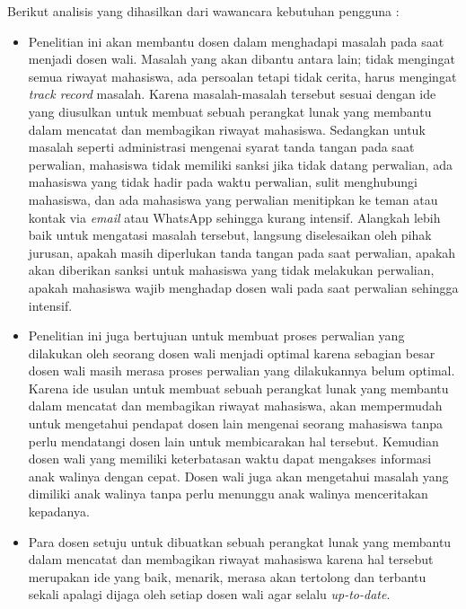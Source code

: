 Berikut analisis yang dihasilkan dari wawancara kebutuhan pengguna :
\begin{itemize}
\item Penelitian ini akan membantu dosen dalam menghadapi masalah pada saat menjadi dosen wali. Masalah yang akan dibantu antara lain; tidak mengingat semua riwayat mahasiswa, ada persoalan tetapi tidak cerita, harus mengingat {\it track record} masalah. Karena masalah-masalah tersebut sesuai dengan ide yang diusulkan untuk membuat sebuah perangkat lunak yang membantu dalam mencatat dan membagikan riwayat mahasiswa. Sedangkan untuk masalah seperti administrasi mengenai syarat tanda tangan pada saat perwalian, mahasiswa tidak memiliki sanksi jika tidak datang perwalian, ada mahasiswa yang tidak hadir pada waktu perwalian, sulit menghubungi mahasiswa, dan ada mahasiswa yang perwalian menitipkan ke teman atau kontak via {\it email} atau WhatsApp sehingga kurang intensif. Alangkah lebih baik untuk mengatasi masalah tersebut, langsung diselesaikan oleh pihak jurusan, apakah masih diperlukan tanda tangan pada saat perwalian, apakah akan diberikan sanksi untuk mahasiswa yang tidak melakukan perwalian, apakah mahasiswa wajib menghadap dosen wali pada saat perwalian sehingga intensif.
\item Penelitian ini juga bertujuan untuk membuat proses perwalian yang dilakukan oleh seorang dosen wali menjadi optimal karena sebagian besar dosen wali masih merasa proses perwalian yang dilakukannya belum optimal. Karena ide usulan untuk membuat sebuah perangkat lunak yang membantu dalam mencatat dan membagikan riwayat mahasiswa, akan mempermudah untuk mengetahui pendapat dosen lain mengenai seorang mahasiswa tanpa perlu mendatangi dosen lain untuk membicarakan hal tersebut. Kemudian dosen wali yang memiliki keterbatasan waktu dapat mengakses informasi anak walinya dengan cepat. Dosen wali juga akan mengetahui masalah yang dimiliki anak walinya tanpa perlu menunggu anak walinya menceritakan kepadanya.
\item Para dosen setuju untuk dibuatkan sebuah perangkat lunak yang membantu dalam mencatat dan membagikan riwayat mahasiswa karena hal tersebut merupakan ide yang baik, menarik, merasa akan tertolong dan terbantu sekali apalagi dijaga oleh setiap dosen wali agar selalu {\it up-to-date}.

\end{itemize}
